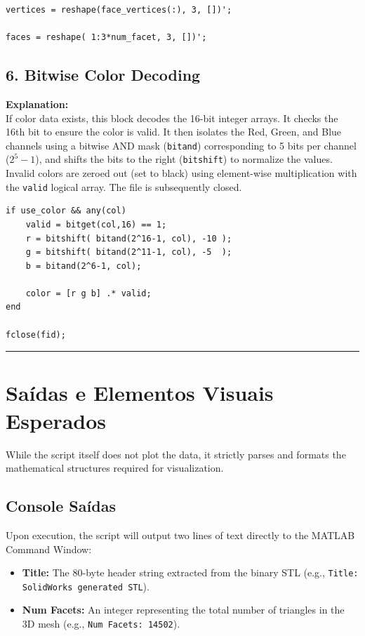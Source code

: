 \begin{lstlisting}
vertices = reshape(face_vertices(:), 3, [])';

faces = reshape( 1:3*num_facet, 3, [])';
\end{lstlisting}


\subsection{6. Bitwise Color Decoding}
\textbf{Explanation:} \\
If color data exists, this block decodes the 16-bit integer arrays. It checks the 16th bit to ensure the color is valid. It then isolates the Red, Green, and Blue channels using a bitwise AND mask (\texttt{bitand}) corresponding to 5 bits per channel ($2^5-1$), and shifts the bits to the right (\texttt{bitshift}) to normalize the values. Invalid colors are zeroed out (set to black) using element-wise multiplication with the \texttt{valid} logical array. The file is subsequently closed.

\begin{lstlisting}
if use_color && any(col)
	valid = bitget(col,16) == 1;
	r = bitshift( bitand(2^16-1, col), -10 );
	g = bitshift( bitand(2^11-1, col), -5  );
	b = bitand(2^6-1, col);

	color = [r g b] .* valid;
end

fclose(fid);
\end{lstlisting}

\vspace{0.5cm}
\hrule
\vspace{0.5cm}

\section{Saídas e Elementos Visuais Esperados}

While the script itself does not plot the data, it strictly parses and formats the mathematical structures required for visualization. 

\subsection*{Console Saídas}
Upon execution, the script will output two lines of text directly to the MATLAB Command Window:
\begin{itemize}
    \item \textbf{Title:} The 80-byte header string extracted from the binary STL (e.g., \texttt{Title: SolidWorks generated STL}).
    \item \textbf{Num Facets:} An integer representing the total number of triangles in the 3D mesh (e.g., \texttt{Num Facets: 14502}).
\end{itemize}

